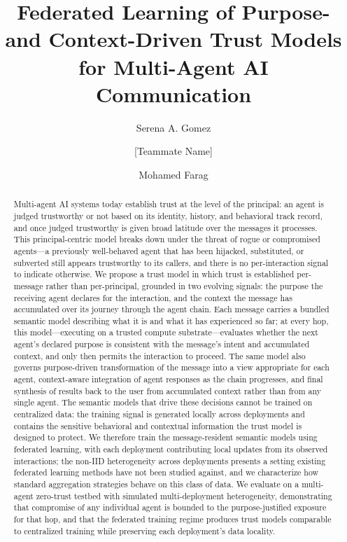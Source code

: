 \documentclass[sigconf,nonacm]{acmart}
\title{Federated Learning of Purpose- and Context-Driven Trust Models for Multi-Agent AI Communication}
\author{Serena A. Gomez}
\affiliation{%
  \institution{Carnegie Mellon University}
  \city{Pittsburgh}
  \state{PA}
  \country{USA}
}
\author{[Teammate Name]}
\affiliation{%
  \institution{Carnegie Mellon University}
  \city{Pittsburgh}
  \state{PA}
  \country{USA}
}
\author{Mohamed Farag}
\affiliation{%
  \institution{Carnegie Mellon University}
  \city{Pittsburgh}
  \state{PA}
  \country{USA}
}
\begin{document}
\begin{abstract}
Multi-agent AI systems today establish trust at the level of the principal: an agent is judged trustworthy or not based on its identity, history, and behavioral track record, and once judged trustworthy is given broad latitude over the messages it processes. This principal-centric model breaks down under the threat of rogue or compromised agents---a previously well-behaved agent that has been hijacked, substituted, or subverted still appears trustworthy to its callers, and there is no per-interaction signal to indicate otherwise. We propose a trust model in which trust is established per-message rather than per-principal, grounded in two evolving signals: the purpose the receiving agent declares for the interaction, and the context the message has accumulated over its journey through the agent chain. Each message carries a bundled semantic model describing what it is and what it has experienced so far; at every hop, this model---executing on a trusted compute substrate---evaluates whether the next agent's declared purpose is consistent with the message's intent and accumulated context, and only then permits the interaction to proceed. The same model also governs purpose-driven transformation of the message into a view appropriate for each agent, context-aware integration of agent responses as the chain progresses, and final synthesis of results back to the user from accumulated context rather than from any single agent. The semantic models that drive these decisions cannot be trained on centralized data: the training signal is generated locally across deployments and contains the sensitive behavioral and contextual information the trust model is designed to protect. We therefore train the message-resident semantic models using federated learning, with each deployment contributing local updates from its observed interactions; the non-IID heterogeneity across deployments presents a setting existing federated learning methods have not been studied against, and we characterize how standard aggregation strategies behave on this class of data. We evaluate on a multi-agent zero-trust testbed with simulated multi-deployment heterogeneity, demonstrating that compromise of any individual agent is bounded to the purpose-justified exposure for that hop, and that the federated training regime produces trust models comparable to centralized training while preserving each deployment's data locality.
\end{abstract}

\end{document}
